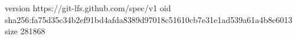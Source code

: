 version https://git-lfs.github.com/spec/v1
oid sha256:fa75d35c34b2ef91bd4afda8389d97018c51610cb7e31e1ad539a61a4b8e6013
size 281868
